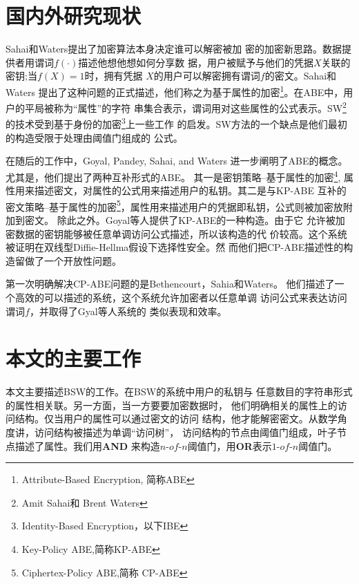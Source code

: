 \section{国内外研究现状}
Sahai和Waters\cite{SW:FuzzyIBE}提出了加密算法本身决定谁可以解密被加
密的加密新思路。数据提供者用谓词$f(\cdot)$描述他想他想如何分享数
据，用户被赋予与他们的凭据$X$关联的密钥;当$f(X)=1$时，拥有凭据
$X$的用户可以解密拥有谓词$f$的密文。Sahai和Waters\cite{SW:FuzzyIBE}
提出了这种问题的正式描述，他们称之为基于属性的加密\footnote{Attribute-Based 
Encryption, 简称ABE}。在ABE中，用户的平局被称为“属性”的字符
串集合表示，谓词用对这些属性的公式表示。SW\footnote{Amit Sahai和
Brent Waters}的技术受到基于身份的加密\footnote{Identity-Based 
Encryption，以下IBE}上一些工作\cite{Shamir:IBC,BF:IBE,Cocks:IBE,CHK:fspk,BB:IBE}
的启发。SW方法的一个缺点是他们最初的构造受限于处理由阈值门组成的
公式。\par
在随后的工作中，Goyal, Pandey, Sahai, and Waters\cite{GPSW:ABE}
进一步阐明了ABE的概念。尤其是，他们提出了两种互补形式的ABE。
其一是密钥策略--基于属性的加密\footnote{Key-Policy ABE,简称KP-ABE},
属性用来描述密文，对属性的公式用来描述用户的私钥。其二是与KP-ABE
互补的密文策略--基于属性的加密\footnote{Ciphertex-Policy ABE,简称
CP-ABE}，属性用来描述用户的凭据即私钥，公式则被加密放附加到密文。
除此之外。Goyal等人\cite{GPSW:ABE}提供了KP-ABE的一种构造。由于它
允许被加密数据的密钥能够被任意单调访问公式描述，所以该构造的代
价较高。这个系统被证明在双线型Diffie-Hellma假设下选择性安全。然
而他们把CP-ABE描述性的构造留做了一个开放性问题。\par
第一次明确解决CP-ABE问题的是Bethencourt，Sahia和Waters\cite{BSW:CPABE}。
他们描述了一个高效的可以描述的系统，这个系统允许加密者以任意单调
访问公式来表达访问谓词$f$，并取得了Gyal等人\cite{GPSW:ABE}系统的
类似表现和效率。
\section{本文的主要工作}
本文主要描述BSW的工作\cite{BSW:CPABE}。在BSW的系统中用户的私钥与
任意数目的字符串形式的属性相关联。另一方面，当一方要要加密数据时，
他们明确相关的属性上的访问结构。仅当用户的属性可以通过密文的访问
结构，他才能解密密文。从数学角度讲，访问结构被描述为单调“访问树”，
访问结构的节点由阈值门组成，叶子节点描述了属性。我们用\textbf{AND}
来构造$n\textrm{-}of\textrm{-}n$阈值门，用\textbf{OR}表示$1\textrm{-}of\textrm{-}n$阈值门。
